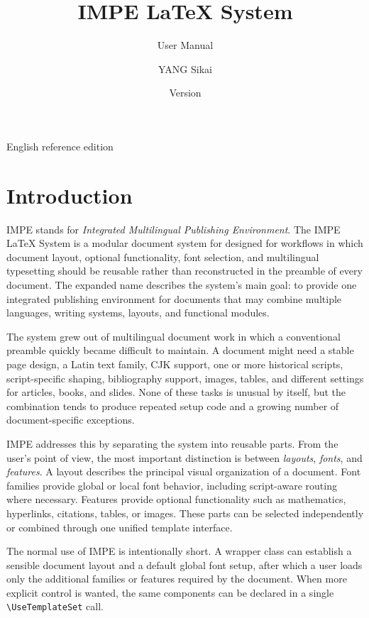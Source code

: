 \documentclass[11pt]{impeart}
\title{IMPE \LaTeX{} System}
\subtitle{User Manual}
\author{YANG Sikai}
\date{Version \IMPEVersion}
\begin{document}
\maketitle

\begin{center}
\small English reference edition
\end{center}

\tableofcontents

\section{Introduction}

IMPE stands for \emph{Integrated Multilingual Publishing Environment}.
The IMPE \LaTeX{} System is a modular document system for \XeLaTeX{} designed
for workflows in which document layout, optional functionality, font selection,
and multilingual typesetting should be reusable rather than reconstructed in
the preamble of every document.  The expanded name describes the system's main
goal: to provide one integrated publishing environment for documents that may
combine multiple languages, writing systems, layouts, and functional modules.

The system grew out of multilingual document work in which a conventional
preamble quickly became difficult to maintain.  A document might need a stable
page design, a Latin text family, CJK support, one or more historical scripts,
script-specific shaping, bibliography support, images, tables, and different
settings for articles, books, and slides.  None of these tasks is unusual by
itself, but the combination tends to produce repeated setup code and a growing
number of document-specific exceptions.

IMPE addresses this by separating the system into reusable parts.  From the
user's point of view, the most important distinction is between \emph{layouts},
\emph{fonts}, and \emph{features}.  A layout describes the principal visual
organization of a document.  Font families provide global or local font
behavior, including script-aware routing where necessary.  Features provide
optional functionality such as mathematics, hyperlinks, citations, tables, or
images.  These parts can be selected independently or combined through one
unified template interface.

The normal use of IMPE is intentionally short.  A wrapper class can establish a
sensible document layout and a default global font setup, after which a user
loads only the additional families or features required by the document.  When
more explicit control is wanted, the same components can be declared in a
single \verb|\UseTemplateSet| call.
\end{document}
